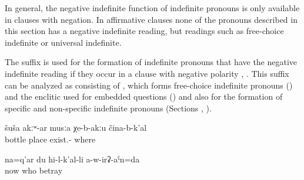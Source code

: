In general, the negative indefinite function of indefinite pronouns is only available in clauses with negation. In affirmative clauses none of the pronouns described in this section has a negative indefinite reading, but readings such as free-choice indefinite or universal indefinite. 

The suffix  is used for the formation of indefinite pronouns that have the negative indefinite reading if they occur in a clause with negative polarity , . This suffix can be analyzed as consisting of , which forms free-choice indefinite pronouns () and the enclitic used for embedded questions () and also for the formation of specific and non-specific indefinite pronouns (Sections , ).
%
\begin{exe}
	\ex	\label{ex:There is no place where there are no bottles}
	\gll	šuša	akːʷ-ar	musːa	χe-b-akːu	čina-b-k'al\\
		bottle		place	exist.-	where\\
	\glt	{}

	\ex	\label{ex:Now nobody will betray me anymore}
	\gll	na=q'ar	du	hi-l-k'al-li	a-w-irʡ-aˁn=da\\
		now		who	betray\\
	\glt	{}
\end{exe}

